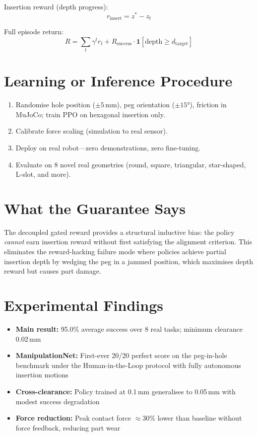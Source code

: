 \documentclass[10pt,twocolumn]{article}
\begin{document}
Insertion reward (depth progress):
\[
r_{\mathrm{insert}} = z^* - z_t
\]

Full episode return:
\[
R = \sum_t \gamma^t r_t
  + R_{\mathrm{success}}\cdot\mathbf{1}[\mathrm{depth}\ge d_{\mathrm{target}}]
\]

\section{Learning or Inference Procedure}

\begin{enumerate}[itemsep=2pt,parsep=0pt]
  \item Randomise hole position ($\pm5$\,mm), peg orientation ($\pm15°$),
    friction in MuJoCo; train PPO on hexagonal insertion only.
  \item Calibrate force scaling (simulation to real sensor).
  \item Deploy on real robot---zero demonstrations, zero fine-tuning.
  \item Evaluate on 8 novel real geometries (round, square, triangular,
    star-shaped, L-slot, and more).
\end{enumerate}

\section{What the Guarantee Says}

The decoupled gated reward provides a structural inductive bias: the
policy \emph{cannot} earn insertion reward without first satisfying
the alignment criterion. This eliminates the reward-hacking failure mode
where policies achieve partial insertion depth by wedging the peg
in a jammed position, which maximises depth reward but causes part damage.

\section{Experimental Findings}

\begin{itemize}[itemsep=2pt,parsep=0pt]
  \item \textbf{Main result:} 95.0\% average success over 8 real tasks;
    minimum clearance 0.02\,mm
  \item \textbf{ManipulationNet:} First-ever 20/20 perfect score on the
    peg-in-hole benchmark under the Human-in-the-Loop protocol with fully
    autonomous insertion motions
  \item \textbf{Cross-clearance:} Policy trained at 0.1\,mm generalises
    to 0.05\,mm with modest success degradation
  \item \textbf{Force reduction:} Peak contact force $\approx$30\% lower
    than baseline without force feedback, reducing part wear
\end{itemize}
\end{document}
